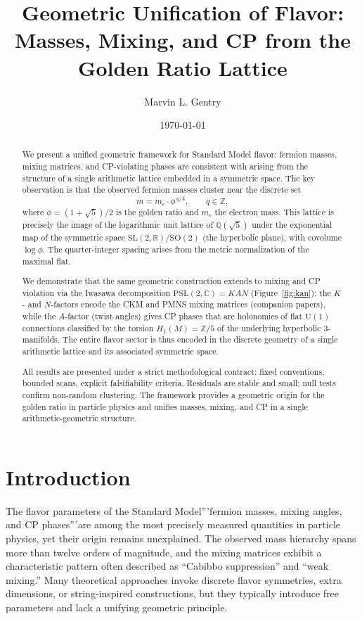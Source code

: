 \documentclass[12pt]{article}
\title{Geometric Unification of Flavor:\\ Masses, Mixing, and CP from the Golden Ratio Lattice}
\author[1]{Marvin L. Gentry}
\affil[1]{Independent Researcher, \texttt{drmlgentry@protonmail.com} \\ ORCID: 0009-0006-4550-2663}
\date{\today}
\theoremstyle{definition}
\begin{document}
\maketitle

\begin{abstract}
We present a unified geometric framework for Standard Model flavor: fermion masses, mixing matrices, and CP-violating phases are consistent with arising from the structure of a single arithmetic lattice embedded in a symmetric space. The key observation is that the observed fermion masses cluster near the discrete set
\[
m = m_e \cdot \phi^{\,q/4}, \qquad q\in\mathbb{Z},
\]
where $\phi = (1+\sqrt5)/2$ is the golden ratio and $m_e$ the electron mass. This lattice is precisely the image of the logarithmic unit lattice of $\mathbb{Q}(\sqrt5)$ under the exponential map of the symmetric space $\mathrm{SL}(2,\mathbb{R})/\mathrm{SO}(2)$ (the hyperbolic plane), with covolume $\log\phi$. The quarter-integer spacing arises from the metric normalization of the maximal flat.

We demonstrate that the same geometric construction extends to mixing and CP violation via the Iwasawa decomposition $\mathrm{PSL}(2,\mathbb{C}) = KAN$ (Figure~\ref{fig:kan}): the $K$- and $N$-factors encode the CKM and PMNS mixing matrices (companion papers), while the $A$-factor (twist angles) gives CP phases that are holonomies of flat $\mathrm{U}(1)$ connections classified by the torsion $H_1(M)=\mathbb{Z}/5$ of the underlying hyperbolic 3-manifolds. The entire flavor sector is thus encoded in the discrete geometry of a single arithmetic lattice and its associated symmetric space.

All results are presented under a strict methodological contract: fixed conventions, bounded scans, explicit falsifiability criteria. Residuals are stable and small; null tests confirm non-random clustering. The framework provides a geometric origin for the golden ratio in particle physics and unifies masses, mixing, and CP in a single arithmetic-geometric structure.
\end{abstract}

\section{Introduction}
\label{sec:intro}

The flavor parameters of the Standard Model'''fermion masses, mixing angles, and CP phases'''are among the most precisely measured quantities in particle physics, yet their origin remains unexplained. The observed mass hierarchy spans more than twelve orders of magnitude, and the mixing matrices exhibit a characteristic pattern often described as ``Cabibbo suppression'' and ``weak mixing.'' Many theoretical approaches invoke discrete flavor symmetries, extra dimensions, or string-inspired constructions, but they typically introduce free parameters and lack a unifying geometric principle.
\end{document}
